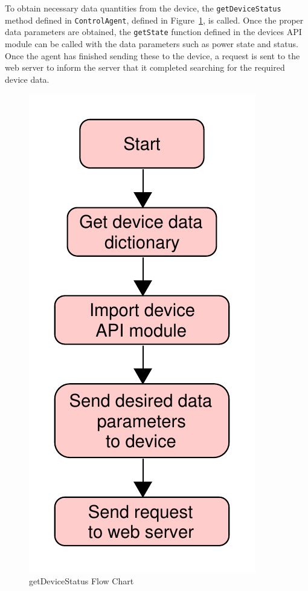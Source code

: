 \documentclass[conference]{IEEEtran}
\begin{document}
To obtain necessary data quantities from the device, the
\texttt{getDeviceStatus} method defined in \texttt{ControlAgent}, defined in Figure~\ref{fig:getDeviceStatus}, is called. Once the proper data parameters are
obtained, the \texttt{getState} function defined in the devices API module can
be called with the data parameters such as power state and
status. Once the agent has finished sending these to the device, a request is
sent to the web server to inform the server that it completed searching for the
required device data. %
%
\begin{figure}[htbp]
    \centering
    \includegraphics[scale=0.4]{figs/agents/getDeviceStatus.pdf}
    \caption{getDeviceStatus Flow Chart}
    \label{fig:getDeviceStatus}
\end{figure}
\end{document}
